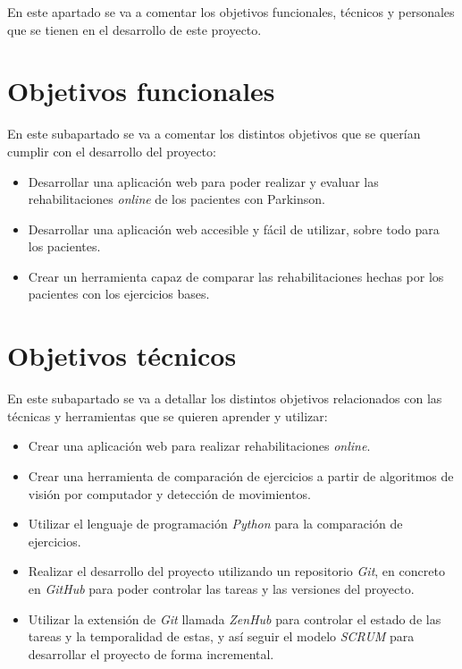 
En este apartado se va a comentar los objetivos funcionales, técnicos y personales que se tienen en el desarrollo de este proyecto.

\section{Objetivos funcionales}
En este subapartado se va a comentar los distintos objetivos que se querían cumplir con el desarrollo del proyecto:
\begin{itemize}
	\item Desarrollar una aplicación web para poder realizar y evaluar las rehabilitaciones \textit{online} de los pacientes con Parkinson.
	\item Desarrollar una aplicación web accesible y fácil de utilizar, sobre todo para los pacientes.
	\item Crear un herramienta capaz de comparar las rehabilitaciones hechas por los pacientes con los ejercicios bases.
\end{itemize}

\section{Objetivos técnicos}
En este subapartado se va a detallar los distintos objetivos relacionados con las técnicas y herramientas que se quieren aprender y utilizar:
\begin{itemize}
	\item Crear una aplicación web para realizar rehabilitaciones \textit{online}.
	\item Crear una herramienta de comparación de ejercicios a partir de algoritmos de visión por computador y detección de movimientos.
	\item Utilizar el lenguaje de programación \textit{Python} para la comparación de ejercicios.
	\item Realizar el desarrollo del proyecto utilizando un repositorio \textit{Git}, en concreto en \textit{GitHub} para poder controlar las tareas y las versiones del proyecto.
	\item Utilizar la extensión de \textit{Git} llamada \textit{ZenHub} para controlar el estado de las tareas y la temporalidad de estas, y así seguir el modelo \textit{SCRUM} para desarrollar el proyecto de forma incremental.
\end{itemize}

